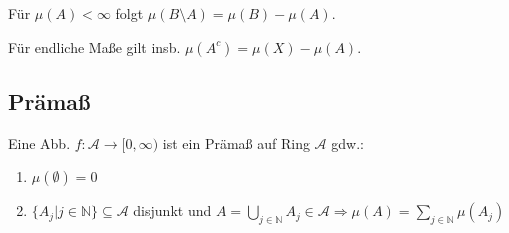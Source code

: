 Für $\mu(A) < \infty$ folgt $\mu(B\setminus A) = \mu(B) - \mu(A)$.

Für endliche Maße gilt insb. $\mu(A^c) = \mu(X) - \mu(A)$.

\subsection*{Prämaß}

Eine Abb. $f : \mathcal{A} \rightarrow [0, \infty)$ ist ein Prämaß auf Ring $\mathcal{A}$ gdw.:

\begin{enumerate}[label=(\alph*)]
	\item $\mu(\emptyset) = 0$
	\item $\{A_j | j \in \mathbb{N}\} \subseteq \mathcal{A}$ disjunkt und $A = \bigcup_{j\in \mathbb{N}} A_j \in \mathcal{A} \Rightarrow \mu(A) = \sum_{j\in \mathbb{N}} \mu(A_j)$
\end{enumerate}
